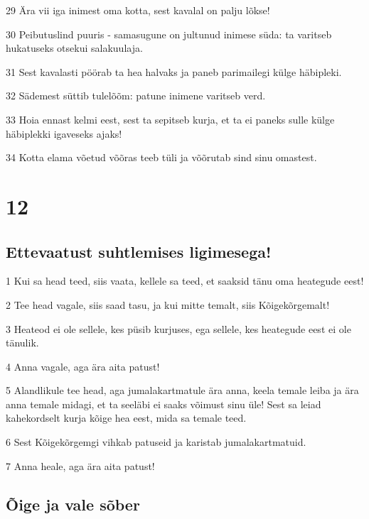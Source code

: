 \par 29 Ära vii iga inimest oma kotta, sest kavalal on palju lõkse!
\par 30 Peibutuslind puuris - samasugune on jultunud inimese süda: ta varitseb hukatuseks otsekui salakuulaja.
\par 31 Sest kavalasti pöörab ta hea halvaks ja paneb parimailegi külge häbipleki.
\par 32 Sädemest süttib tulelõõm: patune inimene varitseb verd.
\par 33 Hoia ennast kelmi eest, sest ta sepitseb kurja, et ta ei paneks sulle külge häbiplekki igaveseks ajaks!
\par 34 Kotta elama võetud võõras teeb tüli ja võõrutab sind sinu omastest.

\chapter{12}

\section*{Ettevaatust suhtlemises ligimesega!}

\par 1 Kui sa head teed, siis vaata, kellele sa teed, et saaksid tänu oma heategude eest!
\par 2 Tee head vagale, siis saad tasu, ja kui mitte temalt, siis Kõigekõrgemalt!
\par 3 Heateod ei ole sellele, kes püsib kurjuses, ega sellele, kes heategude eest ei ole tänulik.
\par 4 Anna vagale, aga ära aita patust!
\par 5 Alandlikule tee head, aga jumalakartmatule ära anna, keela temale leiba ja ära anna temale midagi, et ta seeläbi ei saaks võimust sinu üle! Sest sa leiad kahekordselt kurja kõige hea eest, mida sa temale teed.
\par 6 Sest Kõigekõrgemgi vihkab patuseid ja karistab jumalakartmatuid.
\par 7 Anna heale, aga ära aita patust!

\section*{Õige ja vale sõber}

